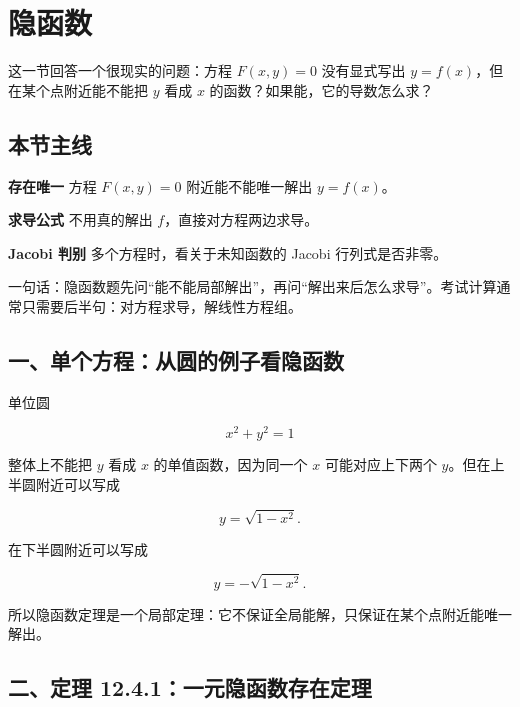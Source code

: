 \section{隐函数}

这一节回答一个很现实的问题：方程 \(F(x,y)=0\) 没有显式写出 \(y=f(x)\)，但在某个点附近能不能把 \(y\) 看成 \(x\) 的函数？如果能，它的导数怎么求？

\subsection*{本节主线}

\begin{conceptbox}
\textbf{存在唯一}
方程 \(F(x,y)=0\) 附近能不能唯一解出 \(y=f(x)\)。
\end{conceptbox}

\begin{conceptbox}
\textbf{求导公式}
不用真的解出 \(f\)，直接对方程两边求导。
\end{conceptbox}

\begin{conceptbox}
\textbf{Jacobi 判别}
多个方程时，看关于未知函数的 Jacobi 行列式是否非零。
\end{conceptbox}

\begin{notebox}
一句话：隐函数题先问“能不能局部解出”，再问“解出来后怎么求导”。考试计算通常只需要后半句：对方程求导，解线性方程组。
\end{notebox}

\subsection*{一、单个方程：从圆的例子看隐函数}

单位圆

\[
      x^2+y^2=1
    \]

整体上不能把 \(y\) 看成 \(x\) 的单值函数，因为同一个 \(x\) 可能对应上下两个 \(y\)。但在上半圆附近可以写成

\[
      y=\sqrt{1-x^2}.
    \]

在下半圆附近可以写成

\[
      y=-\sqrt{1-x^2}.
    \]

所以隐函数定理是一个局部定理：它不保证全局能解，只保证在某个点附近能唯一解出。

\subsection*{二、定理 12.4.1：一元隐函数存在定理}

